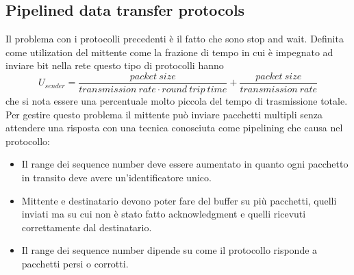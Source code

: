 \subsection{Pipelined data transfer protocols}
Il problema con i protocolli precedenti \`e il fatto che sono stop and wait. Definita come utilization del mittente come la frazione di tempo in cui \`e 
impegnato ad inviare bit nella rete questo tipo di protocolli hanno 
\begin{equation*}
U_{sender}=\dfrac{packet\ size}{transmission\ rate\cdot round\ trip\ time}+
\dfrac{packet\ size}{transmission\ rate}
\end{equation*}
 che si nota essere una percentuale molto piccola del tempo di trasmissione totale. Per gestire questo problema
il mittente pu\`o inviare pacchetti multipli senza attendere una risposta con una tecnica conosciuta come pipelining che causa nel protocollo:
\begin{itemize}
\item Il range dei sequence number deve essere aumentato in quanto ogni pacchetto in transito deve avere un'identificatore unico. 
\item Mittente e destinatario devono poter fare del buffer su pi\`u pacchetti, quelli inviati ma su cui non \`e stato fatto acknowledgment e quelli ricevuti
correttamente dal destinatario.
\item Il range dei sequence number dipende su come il protocollo risponde a pacchetti persi o corrotti. 
\end{itemize}
